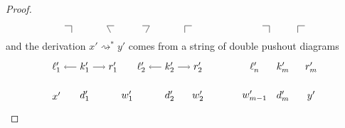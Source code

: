 \documentclass{amsart}
\newcommand{\deriv}[2]{#1 \rightsquigarrow^\ast #2}
\theoremstyle{remark}
\theoremstyle{definition}
\begin{document}
\begin{proof}
\[\begin{tikzpicture}
\begin{scope}[shift={(0,0)}]
        \draw [-] (0.25,0.5) to node [] {} (0.5,0.5);
        \draw [-] (0.5,0.5) to node [] {} (0.5,0.25);
      \end{scope}
      \begin{scope}[shift={(1.75,0)}]
        \draw [-] (0.125,0.25) to (0,0.5);
        \draw [-] (0,0.5) to (0.25,0.5);
      \end{scope}
      \begin{scope}[shift={(2.75,0)}]
        \draw [-] (0.25,0.5) to node [] {} (0.5,0.5);
        \draw [-] (0.5,0.5) to node [] {} (0.375,0.25);
      \end{scope}
      \begin{scope}[shift={(4.5,0)}]
        \draw [-] (0,0.25) to (0,0.5);
        \draw [-] (0,0.5) to (0.25,0.5);
      \end{scope}
      \begin{scope}[shift={(7,0)}]
        \draw [-] (0.25,0.5) to node [] {} (0.5,0.5);
        \draw [-] (0.5,0.5) to node [] {} (0.5,0.25);
      \end{scope}
      \begin{scope}[shift={(8.5,0)}]
        \draw [-] (0,0.25) to (0,0.5);
        \draw [-] (0,0.5) to (0.25,0.5);
      \end{scope}     
    \end{tikzpicture}
  \]
  and the derivation $ \deriv{x'}{y'} $ comes from a string
  of double pushout diagrams
  \[
    \begin{tikzpicture}
      \node (1t) at (0,1) {$ \ell'_1 $};
      \node (2t) at (1,1) {$ k'_1 $};
      \node (3t) at (2,1) {$ r'_1 $};
      \node (4t) at (3,1) {$ \ell'_2 $};
      \node (5t) at (4,1) {$ k'_2 $};
      \node (6t) at (5,1) {$ r'_2 $};
      \node (7t) at (7,1) {$ \ell'_n $};
      \node (8t) at (8,1) {$ k'_m $};
      \node (9t) at (9,1) {$ r'_m $};
      \node (1b) at (0,0) {$ x' $};
      \node (2b) at (1,0) {$ d'_1 $};
      \node (3b) at (2.5,0) {$ w'_1 $};
      \node (4b) at (4,0) {$ d'_2 $};
      \node (5b) at (5,0) {$ w'_2 $};
      \node (6b) at (7,0) {$ w'_{m-1} $};
      \node (7b) at (8,0) {$ d'_m $};
      \node (8b) at (9,0) {$ y' $};
      \draw [->] (2t) to node [] {\scriptsize{$  $}} (1t);
      \draw [->] (2t) to node [] {\scriptsize{$  $}} (3t);
      \draw [->] (5t) to node [] {\scriptsize{$  $}} (4t);
      \draw [->] (5t) to node [] {\scriptsize{$  $}} (6t);

\end{tikzpicture}\]
\end{proof}
\end{document}
